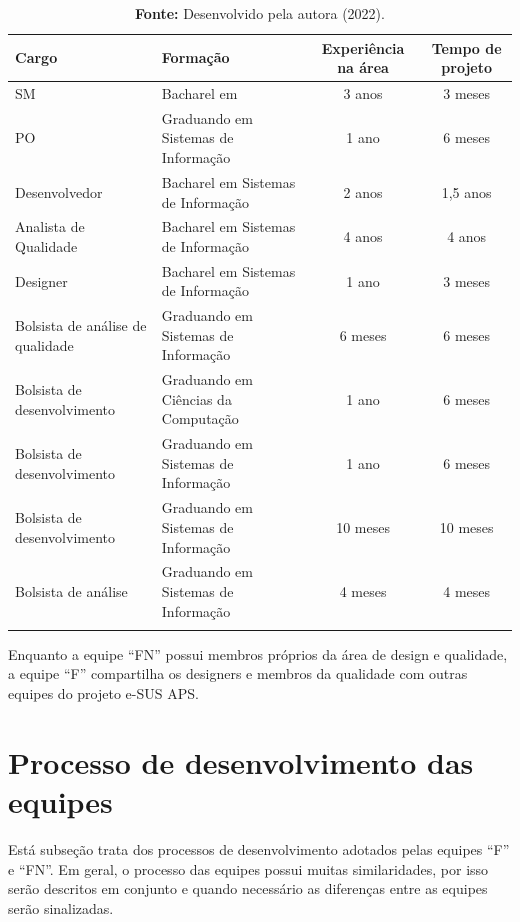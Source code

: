 \documentclass[
    12pt,       %
    openright,      %
    twoside,      %
    a4paper,      %
    english,      %
    french,       %
    spanish,      %
    brazil,       %
    ]{abntex2}
\begin{document}
\begin{longtable}{|p{4cm}|p{4cm}|c|c|}
    \caption{Membros da equipe ``FN''}
    \label{tab:EquipeC}
    \centering
            \centering
            \hline \rowcolor{lightgray}
            \textbf{Cargo} & \textbf{Formação} & \textbf{Experiência na área} & \textbf{Tempo de projeto} 
            \\ \hline 
            SM & Bacharel em & 3 anos & 3 meses 
            \\ \hline 
            PO & Graduando em Sistemas de Informação & 1 ano & 6 meses  
            \\ \hline
            Desenvolvedor & Bacharel em Sistemas de Informação & 2 anos & 1,5 anos 
            \\ \hline 
            Analista de Qualidade & Bacharel em Sistemas de Informação & 4 anos & 4 anos 
            \\ \hline 
            Designer & Bacharel em Sistemas de Informação & 1 ano & 3 meses 
            \\ \hline
            Bolsista de análise de qualidade & Graduando em Sistemas de Informação & 6 meses & 6 meses 
            \\ \hline 
            Bolsista de desenvolvimento & Graduando em Ciências da Computação & 1 ano & 6 meses 
            \\ \hline 
            Bolsista de desenvolvimento & Graduando em Sistemas de Informação & 1 ano & 6 meses 
            \\ \hline             
            Bolsista de desenvolvimento & Graduando em Sistemas de Informação & 10 meses & 10 meses 
            \\ \hline             
            Bolsista de análise & Graduando em Sistemas de Informação & 4 meses & 4 meses 
            \\ \hline 
            \addlinespace[0.2cm]
            \caption*{\textbf{Fonte:} Desenvolvido pela autora (2022).}
\end{longtable}

Enquanto a equipe ``FN'' possui membros próprios da área de design e qualidade, a equipe ``F'' compartilha os designers e membros da qualidade com outras equipes do projeto e-SUS APS. 

\section{Processo de desenvolvimento das equipes}

Está subseção trata dos processos de desenvolvimento adotados pelas equipes ``F'' e ``FN''. Em geral, o processo das equipes possui muitas similaridades, por isso serão descritos em conjunto e quando necessário as diferenças entre as equipes serão sinalizadas.
\end{document}
